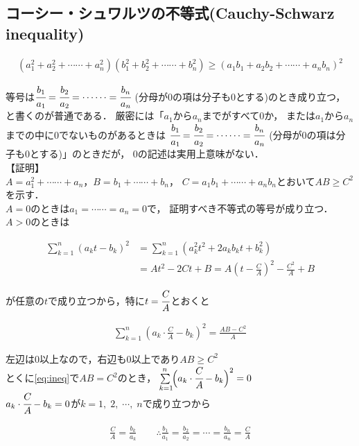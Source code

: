 \documentclass[autodetect-engine,ja=standard, 10.5pt, a4paper, titlepage]{bxjsarticle}
\numberwithin{equation}{section} %
\begin{document}
\subsection{コーシー・シュワルツの不等式(Cauchy-Schwarz inequality)}
\begin{fleqn}[20pt]
  \begin{align*}
    (a_{1}^2+a_{2}^2 + \cdots\cdots + a_{n}^2)(b_{1}^2+b_{2}^2 + \cdots\cdots + b_{n}^2)
    \geq (a_{1}b_{1} + a_{2}b_{2} + \cdots \cdots + a_{n}b_{n})^2
  \end{align*}
\end{fleqn}
等号は$\cfrac{b_{1}}{a_{1}}=\cfrac{b_{2}}{a_{2}}= \cdots\cdots =\cfrac{b_{n}}{a_{n}}$
(分母が0の項は分子も0とする)のとき成り立つ，と書くのが普通である．
厳密には「$a_{1}$から$a_{n}$までがすべて0か，
または$a_{1}$から$a_{n}$までの中に0でないものがあるときは
$\cfrac{b_{1}}{a_{1}}=\cfrac{b_{2}}{a_{2}}= \cdots\cdots =\cfrac{b_{n}}{a_{n}}$
(分母が0の項は分子も0とする)」のときだが，
0の記述は実用上意味がない．\\

\noindent【証明】\\
$A=a_{1}^2+\cdots\cdots + a_{n}$，$B=b_{1}+\cdots\cdots+b_{n}$，
$C=a_{1}b_{1}+\cdots\cdots +a_{n}b_{n}$とおいて$AB\geq C^2$を示す．\\
$A=0$のときは$a_{1} = \cdots\cdots =a_{n}=0$で，
証明すべき不等式の等号が成り立つ．$A>0$のときは
\begin{fleqn}[20pt]
  \begin{align*}
    \sum_{k=1}^{n}(a_{k}t-b_{k})^2 
    &= \sum_{k=1}^{n}(a_{k}^2t^2 + 2a_{k}b_{k}t + b_{k}^2) \\
    &= At^2 -2Ct + B
     = A\left(t-\frac{C}{A}\right)^2 - \frac{C^2}{A} + B
  \end{align*}
\end{fleqn}
が任意の$t$で成り立つから，特に$t=\cfrac{C}{A}$とおくと
\begin{fleqn}[20pt]
  \begin{align*}
    \sum_{k=1}^{n}\left(a_{k}\cdot\frac{C}{A}-b_{k}\right)^2 = \frac{AB-C^2}{A} \tag*{(1)} \label{eq:ineq}
  \end{align*}
\end{fleqn}
左辺は$0$以上なので，右辺も$0$以上であり$AB\geq C^2$\\
とくに\ref*{eq:ineq}で$AB=C^2$のとき，
$\sum \!\!\!\!\!\!\!\! \raisebox{-7.5pt}{$_{k=1}$}\!\!\!\!\!\!\!\!\, \raisebox{6.5pt}{${}^n$}\:\:  \Bigl(a_{k}\cdot\cfrac{C}{A}-b_{k}\Bigr)^2=0$\\
$a_{k}\cdot\cfrac{C}{A}-b_{k}=0$が{$k=1, \;2,\; \cdots,\; n$}で成り立つから\\
\begin{fleqn}[20pt]
  \begin{align*}
    \frac{C}{A} = \frac{b_{k}}{a_{k}}\qquad 
    \therefore \frac{b_{1}}{a_{1}}
              =\frac{b_{2}}{a_{2}}
              =\cdots
              =\frac{b_{n}}{a_{n}}
              =\frac{C}{A}
  \end{align*}
\end{fleqn}
\end{document}
